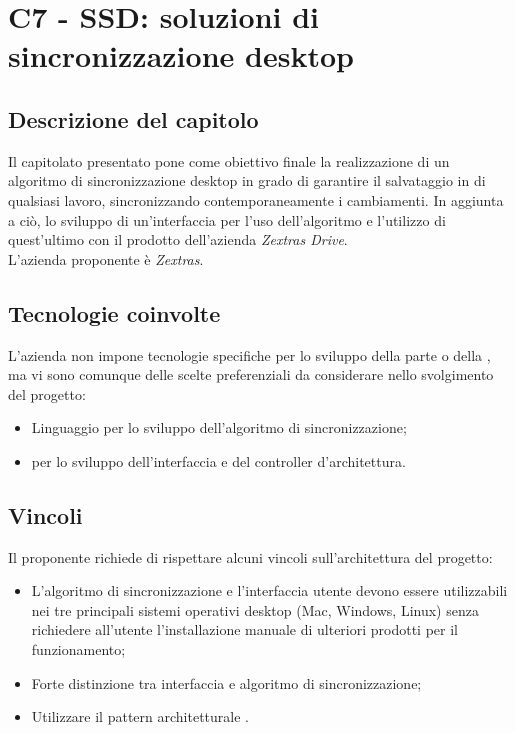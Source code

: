 \section{C7 - SSD: soluzioni di sincronizzazione desktop}

\subsection{Descrizione del capitolo}
Il capitolato presentato pone come obiettivo finale la realizzazione di un algoritmo di sincronizzazione desktop in grado di garantire il salvataggio in  di qualsiasi lavoro, sincronizzando contemporaneamente i cambiamenti. In aggiunta a ciò, lo sviluppo di un'interfaccia  per l'uso dell'algoritmo e l'utilizzo di quest'ultimo con il prodotto dell'azienda \textit{Zextras Drive}.\\
L'azienda proponente è \textit{Zextras}.

\subsection{Tecnologie coinvolte}
L'azienda non impone tecnologie specifiche per lo sviluppo della parte  o della , ma vi sono comunque delle scelte preferenziali da considerare nello svolgimento del progetto:
\begin{itemize}
\item Linguaggio  per lo sviluppo dell'algoritmo di sincronizzazione;
\item {}  per lo sviluppo dell'interfaccia e del controller d'architettura.
\end{itemize}

\subsection{Vincoli}
Il proponente richiede di rispettare alcuni vincoli sull'architettura del progetto: 
\begin{itemize}
\item L'algoritmo di sincronizzazione e l'interfaccia utente devono essere utilizzabili nei tre principali sistemi operativi desktop (Mac, Windows, Linux) senza richiedere all'utente l'installazione manuale di ulteriori prodotti per il funzionamento; 
\item Forte distinzione tra interfaccia e algoritmo di sincronizzazione; 
\item Utilizzare il pattern architetturale .
\end{itemize}

